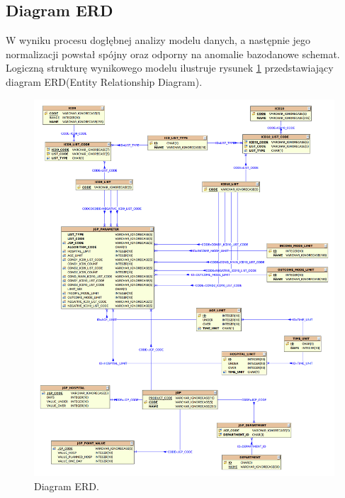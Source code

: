


\newpage
\subsection{Diagram ERD}
\label{sec:diagramERD}

W wyniku procesu dogłębnej analizy modelu danych, a następnie jego normalizacji powstał spójny oraz odporny na anomalie bazodanowe schemat. Logiczną strukturę wynikowego modelu ilustruje rysunek \ref{img:diagram_erd} przedstawiający diagram ERD(Entity Relationship Diagram).

\begin{figure}[!ht]
\centering
\includegraphics[scale=0.31]{images/erd}
\caption[Diagram ERD]{Diagram ERD.}
\label{img:diagram_erd}
\end{figure}

